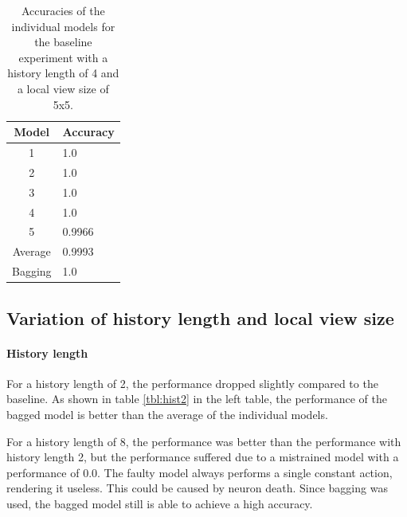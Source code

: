 \documentclass[a4paper, 11pt]{article}
\begin{document}
\begin{table}[ht]
	\centering
    \footnotesize
	\begin{tabular}{cl}
		\toprule
		\textbf{Model}	&	\textbf{Accuracy} \\
		\midrule
		1    &	1.0  \\
		2	&	1.0 \\
		3 	&	1.0 \\
        4 	&	1.0 \\
        5 	&	0.9966 \\
		\midrule
        Average 	&	0.9993 \\
		\midrule
        Bagging 	&	1.0 \\
		\bottomrule
    \end{tabular}
    \caption{Accuracies of the individual models for the baseline experiment with a history length of 4 and a local view size of 5x5. }
    \label{tbl:baseline}
\end{table}

\subsection*{Variation of history length and local view size}
\paragraph{History length}
For a history length of 2, the performance dropped slightly compared to the baseline. As shown in table \ref{tbl:hist2} in the left table, the performance of the bagged model is better than the average of the individual models.

For a history length of 8, the performance was better than the performance with history length 2, but the performance suffered due to a mistrained model with a performance of 0.0. The faulty model always performs a single constant action, rendering it useless. This could be caused by neuron death. Since bagging was used, the bagged model still is able to achieve a high accuracy.
\end{document}
